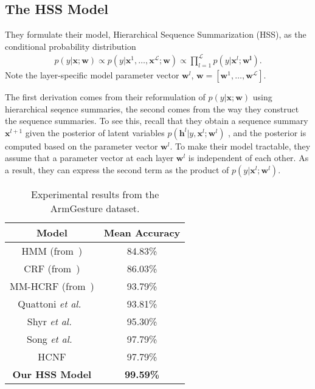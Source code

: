 \documentclass[10pt,twocolumn,letterpaper]{article}
\begin{document}
\subsection{The HSS Model}

They formulate their model, Hierarchical Sequence Summarization (HSS), as the conditional probability distribution\\
\begin{gather}
p(y|\mathbf{x};\mathbf{w}) \propto p(y|\mathbf{x}^1,\dots,\mathbf{x}^{\mathcal{L}};\mathbf{w}) \propto \prod_{l=1}^{\mathcal{L}} p(y|\mathbf{x}^l;\mathbf{w^l}).
\end{gather}
Note the layer-specific model parameter vector $\mathbf{w}^l$, $\mathbf{w} = [\mathbf{w}^1,\dots,\mathbf{w}^{\mathcal{L}}]$.

The first derivation comes from their reformulation of $p(y|\mathbf{x};\mathbf{w})$ using hierarchical seqence summaries, the second comes from the way they construct the sequence summaries. To see this, recall that they obtain a sequence summary $\mathbf{x}^{l+1}$ given the posterior of latent variables $p(\mathbf{h}^l|y,\mathbf{x}^l;\mathbf{w}^l)$ , and the posterior is computed based on the parameter vector $\mathbf{w}^l$. To make their model tractable, they assume that a parameter vector at each layer $\mathbf{w}^l$ is independent of each other. As a result, they can express the second term as the product of $p(y|\mathbf{x}^l;\mathbf{w}^l)$.

\begin{table}
\begin{center}
\begin{tabular}{|c|c|}
 \hline
 Model & Mean Accuracy \\ 
 \hline
 HMM (from~\cite{Hidden}) & 84.83\% \\ 
 CRF (from~\cite{Hidden}) & 86.03\% \\ 
 MM-HCRF (from~\cite{Multi}) & 93.79\% \\
 Quattoni \emph{et al.}~\cite{Multimodal} & 93.81\% \\
 Shyr \emph{et al.}~\cite{Conditional} & 95.30\% \\
 Song \emph{et al.}~\cite{Multi} & 97.79\% \\ 
 HCNF & 97.79\% \\
 \hline
 {\bf Our HSS Model} & {\bf 99.59\%} \\ 
 \hline
\end{tabular}
\end{center}
\caption{Experimental results from the ArmGesture dataset.}
\label{tab1}
\end{table}
\end{document}
